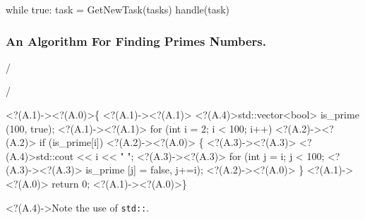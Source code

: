 \documentclass{beamer}
\begin{document}
\begin{frame}[fragile]
    \begin{semiverbatim}
            while true:
                task = GetNewTask(tasks)
                handle(task)
    \end{semiverbatim} 
\end{frame}

\begin{frame}[fragile]
  \frametitle{An Algorithm For Finding Primes Numbers.}
\begin{semiverbatim}
\end{semiverbatim}


\end{frame}

\begin{frame}{\insertframenumber/\insertslidenumber}
\\
\end{frame}
\begin{frame}[fragile]{\insertframenumber/\insertslidenumber}
\begin{semiverbatim}
\uncover<?(A.1)->{\alert<?(A.0)>{\{}}
\uncover<?(A.1)->{\alert<?(A.1)>{  \alert<?(A.4)>{std::}vector<bool> is_prime (100, true);}}
\uncover<?(A.1)->{\alert<?(A.1)>{  for (int i = 2; i < 100; i++)}}
\uncover<?(A.2)->{\alert<?(A.2)>{    if (is_prime[i])}}
\uncover<?(A.2)->{\alert<?(A.0)>{      \{}}
\uncover<?(A.3)->{\alert<?(A.3)>{        \alert<?(A.4)>{std::}cout << i << " ";}}
\uncover<?(A.3)->{\alert<?(A.3)>{        for (int j = i; j < 100;}}
\uncover<?(A.3)->{\alert<?(A.3)>{             is_prime [j] = false, j+=i);}}
\uncover<?(A.2)->{\alert<?(A.0)>{      \}}}
\uncover<?(A.1)->{\alert<?(A.0)>{  return 0;}}
\uncover<?(A.1)->{\alert<?(A.0)>{\}}}
\end{semiverbatim}

  \visible<?(A.4)->{Note the use of \alert{\texttt{std::}}.}

\end{frame}
\end{document}
